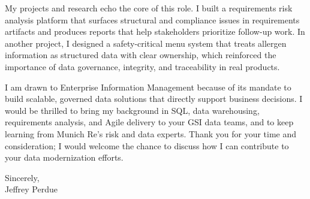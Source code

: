 \documentclass[letterpaper,11pt]{article}
\begin{document}
My projects and research echo the core of this role. I built a requirements risk analysis platform that surfaces structural and compliance issues in requirements artifacts and produces reports that help stakeholders prioritize follow-up work. In another project, I designed a safety-critical menu system that treats allergen information as structured data with clear ownership, which reinforced the importance of data governance, integrity, and traceability in real products.

I am drawn to Enterprise Information Management because of its mandate to build scalable, governed data solutions that directly support business decisions. I would be thrilled to bring my background in SQL, data warehousing, requirements analysis, and Agile delivery to your GSI data teams, and to keep learning from Munich Re's risk and data experts. Thank you for your time and consideration; I would welcome the chance to discuss how I can contribute to your data modernization efforts.

Sincerely,\\

Jeffrey Perdue
\end{document}
